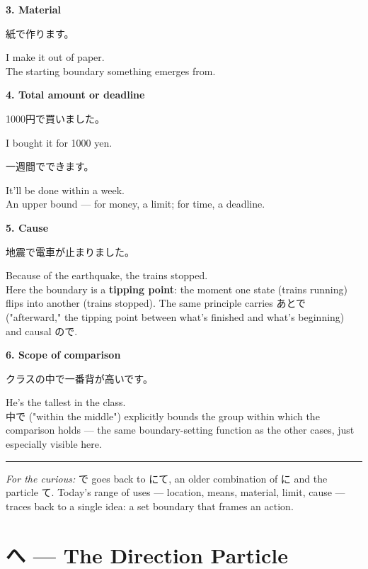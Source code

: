 \documentclass[12pt]{book}
\begin{document}
\textbf{3. Material}
\par\quad 紙で作ります。\\
\par\quad I make it out of paper.\\

The starting boundary something emerges from.

\textbf{4. Total amount or deadline}
\par\quad 1000円で買いました。\\
\par\quad I bought it for 1000 yen.\\

\par\quad 一週間でできます。\\
\par\quad It'll be done within a week.\\

An upper bound — for money, a limit; for time, a deadline.

\textbf{5. Cause}
\par\quad 地震で電車が止まりました。\\
\par\quad Because of the earthquake, the trains stopped.\\

Here the boundary is a \textbf{tipping point}: the moment one state (trains running) flips into another (trains stopped). The same principle carries あとで ("afterward," the tipping point between what's finished and what's beginning) and causal ので.

\textbf{6. Scope of comparison}
\par\quad クラスの中で一番背が高いです。\\
\par\quad He's the tallest in the class.\\

中で ("within the middle") explicitly bounds the group within which the comparison holds — the same boundary-setting function as the other cases, just especially visible here.

\bigskip\hrule\bigskip

\emph{For the curious:} で goes back to にて, an older combination of に and the particle て. Today's range of uses — location, means, material, limit, cause — traces back to a single idea: a set boundary that frames an action.


\chapter{へ — The Direction Particle}
\end{document}
